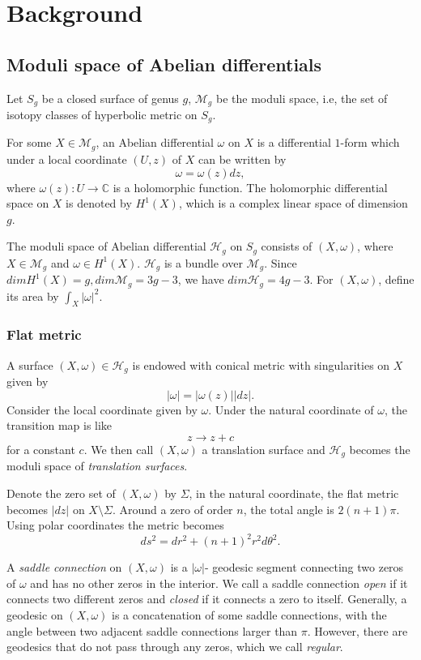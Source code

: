 \documentclass[12pt]{amsart} %
\theoremstyle{definition}
\theoremstyle{remark}
\numberwithin{equation}{section}
\renewcommand\H{{\mathcal H}}
\newcommand{\M}{\mathcal{M}_g}
\begin{document}
\section{Background}
\subsection{Moduli space of Abelian differentials}
Let $S_g$ be a closed surface of genus $g$, $\M$ be the moduli space, i.e, the set of isotopy classes of hyperbolic metric on $S_g$. 

For some $X\in \M$, an Abelian differential $\omega$ on $X$ is a differential $1$-form which under a local coordinate $(U,z)$ of $X$ can be written by
$$\omega=\omega(z)dz,$$
where $\omega(z):U\to \mathbb{C}$ is a holomorphic function. 
The holomorphic differential space on $X$ is denoted by $H^1(X)$, which is a complex linear space of dimension $g$.

The moduli space of Abelian differential $\H_g$ on $S_g$ consists of $(X,\omega)$, 
where $X\in \M$ and $\omega \in H^1(X)$. $\H_g$ is a bundle over $\M$. Since $dimH^1(X)=g, dim\M=3g-3$, we have $dim\H_g=4g-3$.
For $(X,\omega)$, define its area by $\int_X|\omega|^2$.

\subsubsection{Flat metric}

A surface $(X,\omega) \in \H_g$ is endowed with conical metric with singularities on $X$ given by
$$|\omega|=|\omega(z)||dz|.$$
Consider the local coordinate given by $\omega$.
Under the natural coordinate of $\omega$, the transition map is like
$$z\to z+c$$
for a constant $c$. 
We then call $(X,\omega)$ a translation surface and $\H_g$ becomes the moduli space of \emph{translation surfaces}.


Denote the zero set of $(X,\omega)$ by $\Sigma$,
in the natural coordinate, the flat metric becomes $|dz|$ on $X\setminus \Sigma$. 
Around a zero of order $n$, the total angle is $2(n+1)\pi$. Using polar coordinates the metric becomes
$$ds^2=dr^2+(n+1)^2r^2d\theta^2.$$


A \emph{saddle connection} on $(X,\omega)$ is a $|\omega|$- geodesic segment connecting two zeros of $\omega$ and has no other zeros in the interior.
We call a saddle connection \emph{open} if it connects two different zeros and \emph{closed} if it connects a zero to itself.
Generally, a geodesic on $(X,\omega)$ is a concatenation of some saddle connections, with the angle between two adjacent saddle connections larger than $\pi$.
However, there are geodesics that do not pass through any zeros, which we call \emph{regular}.
\end{document}
